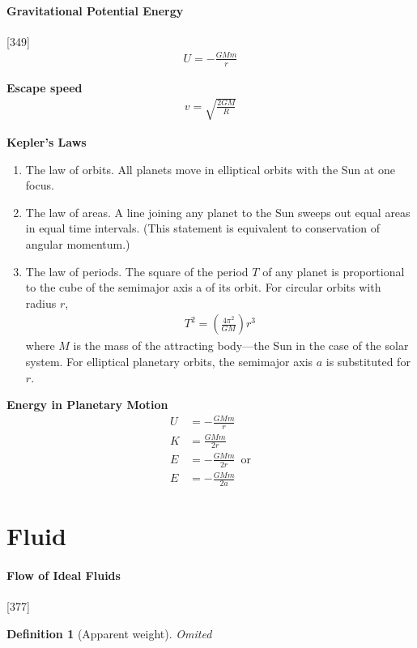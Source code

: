 \documentclass{article}
\numberwithin{equation}{subsection} %
\newtheorem{defi}{Definition}[section]
\theoremstyle{definition}
\begin{document}
\paragraph{Gravitational Potential Energy} [349]
\begin{align}
    U = -\frac{GMm}{r}
\end{align}

\textbf{Escape speed}
\begin{align}
    v = \sqrt{ \frac{2GM}{R} }
\end{align}

\textbf{Kepler's Laws}
\begin{enumerate}
    \item The law of orbits. All planets move in elliptical orbits
        with the Sun at one focus.
    \item The law of areas. A line joining any planet to the Sun
        sweeps out equal areas in equal time intervals. (This
        statement is equivalent to conservation of angular momentum.)
    \item The law of periods. The square of the period $T$ of any
        planet is proportional to the cube of the semimajor axis a of
        its orbit. For circular orbits with radius $r$,
    \begin{align}
        T^2 = \left(\frac{4\pi^2}{GM}\right) r^3
    \end{align}
        where $M$ is the mass of the attracting body—the Sun in the
        case of the solar system. For elliptical planetary orbits, the
        semimajor axis $a$ is substituted for $r$.
\end{enumerate}

\textbf{Energy in Planetary Motion}
\begin{align}
    U &= -\frac{GMm}{r} \\
    K &= \frac{GMm}{2r} \\
    E &= -\frac{GMm}{2r} \,\text{ or} \\
    E &= -\frac{GMm}{2a} 
\end{align}

\section{Fluid}
\label{sec:Fluid}

\paragraph{Flow of Ideal Fluids}[377]
\begin{defi}[Apparent weight]
    Omited
\end{defi}
\end{document}
